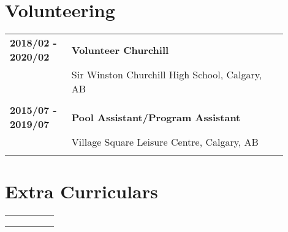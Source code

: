\documentclass[letterpaper]{article}
\begin{document}
    \section*{Volunteering}
        \begin{tabular}{p{0.2\linewidth} p{0.7\linewidth}} 
            \textbf{2018/02 - 2020/02} & \large\textbf{Volunteer Churchill} \\
            & Sir Winston Churchill High School, Calgary, AB \\
            \\
            \textbf{2015/07 - 2019/07} & \large\textbf{Pool Assistant/Program Assistant} \\
            & Village Square Leisure Centre, Calgary, AB \\
            \\
        \end{tabular}

    \section*{Extra Curriculars}
        \begin{tabular}{p{0.2\linewidth} p{0.7\linewidth}} 
            \textbf{} & \large\textbf{} \\
            & \\
            \\
        \end{tabular}
\end{document}
